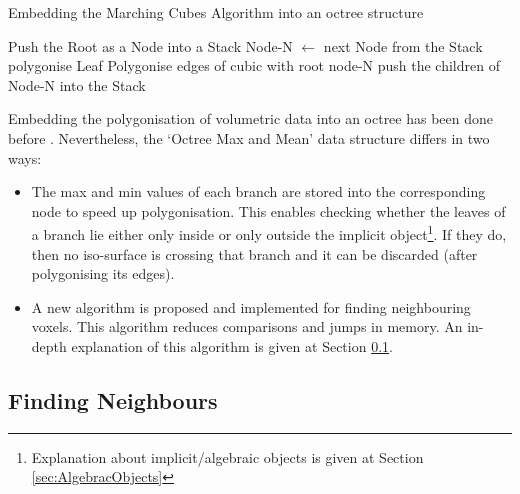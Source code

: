 \documentclass{subfiles}
\begin{document}
\begin{algorithm}[!htbp]
	\caption{Embedding the Marching Cubes Algorithm into an octree structure}
	\label{alg:MCOctree}
	\centering
	\begin{algorithmic}[1]
		\State Push the Root as a Node into a Stack
		\State Node-N   $\gets$  next Node from the Stack 
		\State polygonise Leaf
		\State Polygonise edges of cubic with root node-N	
		\Else
		\State push the children of Node-N into the Stack
		\EndIf
		\EndWhile
	\end{algorithmic}
\end{algorithm}




\par Embedding the polygonisation of volumetric data into an octree has been done before \cite{Wilhelms1990}. Nevertheless, the `Octree Max and Mean' data structure differs in two ways:
\begin{itemize}
	\item The max and min values of each branch are stored into the corresponding node to speed up polygonisation. This enables checking whether the leaves of a branch lie either only inside or only outside the implicit object{\footnote{Explanation about implicit/algebraic objects is given at Section \ref{sec:AlgebracObjects}}}. If they do, then no iso-surface is crossing that branch and it can be discarded (after polygonising its edges).
    \item A new algorithm is proposed and implemented for finding neighbouring voxels. This algorithm reduces comparisons and jumps in memory. An in-depth explanation of this algorithm is given at Section \ref{sec:NeighboursFinding}.
\end{itemize}





\subsection{Finding Neighbours}\label{sec:NeighboursFinding}
\end{document}

